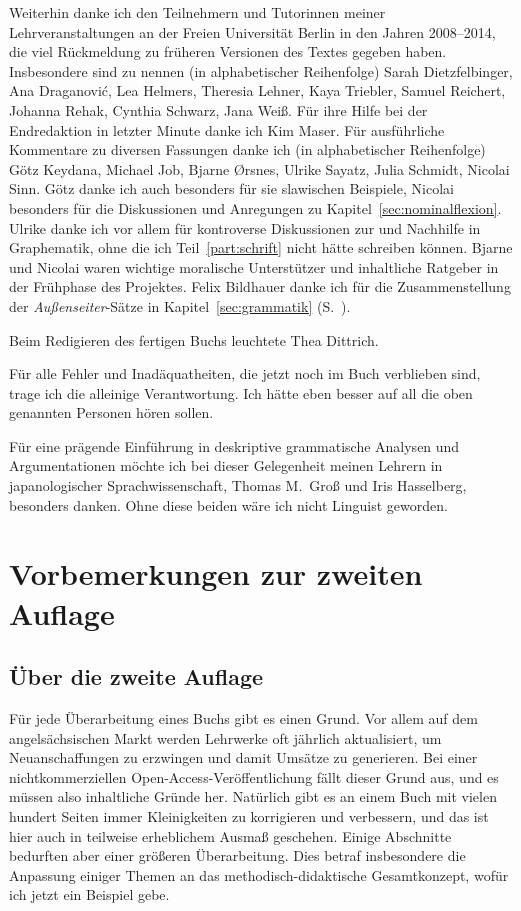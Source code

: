 Weiterhin danke ich den Teilnehmern und Tutorinnen meiner Lehrveranstaltungen an der Freien Universität Berlin in den Jahren 2008--2014, die viel Rückmeldung zu früheren Versionen des Textes gegeben haben.
Insbesondere sind zu nennen (in alphabetischer Reihenfolge) Sarah Dietzfelbinger, Ana Draganovi\'{c}, Lea Helmers, Theresia Lehner, Kaya Triebler, Samuel Reichert, Johanna Rehak, Cynthia Schwarz, Jana Weiß.
Für ihre Hilfe bei der Endredaktion in letzter Minute danke ich Kim Maser.
Für ausführliche Kommentare zu diversen Fassungen danke ich (in alphabetischer Reihenfolge) Götz Keydana, Michael Job, Bjarne Ørsnes, Ulrike Sayatz, Julia Schmidt, Nicolai Sinn.
Götz danke ich auch besonders für sie slawischen Beispiele, Nicolai besonders für die Diskussionen und Anregungen zu Kapitel~\ref{sec:nominalflexion}.
Ulrike danke ich vor allem für kontroverse Diskussionen zur und Nachhilfe in Graphematik, ohne die ich Teil~\ref{part:schrift} nicht hätte schreiben können.
Bjarne und Nicolai waren wichtige moralische Unterstützer und inhaltliche Ratgeber in der Frühphase des Projektes.
Felix Bildhauer danke ich für die Zusammenstellung der \textit{Außenseiter}-Sätze in Kapitel~\ref{sec:grammatik} (S.\ \pageref{ex:dg9113}).

Beim Redigieren des fertigen Buchs leuchtete Thea Dittrich.

Für alle Fehler und Inadäquatheiten, die jetzt noch im Buch verblieben sind, trage ich die alleinige Verantwortung.
Ich hätte eben besser auf all die oben genannten Personen hören sollen.

Für eine prägende Einführung in deskriptive grammatische Analysen und Argumentationen möchte ich bei dieser Gelegenheit meinen Lehrern in japanologischer Sprachwissenschaft, Thomas M.\ Groß und Iris Hasselberg, besonders danken.
Ohne diese beiden wäre ich nicht Linguist geworden.


\Phantom
{}
\chapter*{Vorbemerkungen zur zweiten Auflage}

\section*{Über die zweite Auflage}

Für jede Überarbeitung eines Buchs gibt es einen Grund.
Vor allem auf dem angelsächsischen Markt werden Lehrwerke oft jährlich aktualisiert, um Neuanschaffungen zu erzwingen und damit Umsätze zu generieren.
Bei einer nichtkommerziellen Open-Access-Veröffentlichung fällt dieser Grund aus, und es müssen also inhaltliche Gründe her.
Natürlich gibt es an einem Buch mit vielen hundert Seiten immer Kleinigkeiten zu korrigieren und verbessern, und das ist hier auch in teilweise erheblichem Ausmaß geschehen.
Einige Abschnitte bedurften aber einer größeren Überarbeitung.
Dies betraf insbesondere die Anpassung einiger Themen an das methodisch-didaktische Gesamtkonzept, wofür ich jetzt ein Beispiel gebe.

